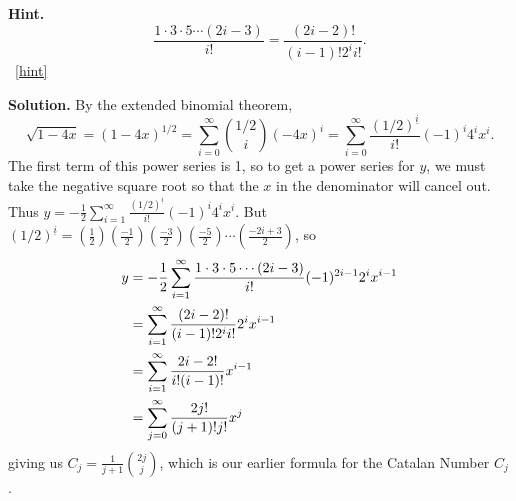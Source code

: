 \documentclass{book}
\begin{document}
\begin{activity}[]
\begin{enumerate}[font=\bfseries,label=(\alph*),ref=\alph*]
\par\smallskip%
\noindent\textbf{Hint.}\hypertarget{hint-175}{}\quad%
\hypertarget{p-1417}{}%
%
\begin{equation*}
\frac{1\cdot 3\cdot 5\cdots (2i-3)}{i!} = \frac{(2i-2)!}{(i-1)!2^i i!}\text{.}
\end{equation*}
%
~\hfill{\tiny\hyperlink{a-271.b}{[hint]}\hypertarget{q-271.b}{}}\par\smallskip%
\noindent\textbf{Solution.}\hypertarget{solution-188}{}\quad%
\hypertarget{p-1418}{}%
By the extended binomial theorem,%
\begin{equation*}
\sqrt{1-4x}=(1-4x)^{1/2} = \sum_{i=0}^\infty \binom{1/2}{i}(-4x)^i=
\sum_{i=0}^\infty \frac{(1/2)^{\underline{i}}}{i!}(-1)^i4^ix^i\text{.}
\end{equation*}
The first term of this power series is 1, so to get a power series for \(y\), we must take the negative square root so that the \(x\) in the denominator will cancel out. Thus \(y=-\frac{1}{2}\sum_{i=1}^\infty \frac{(1/2)^{\underline{i}}}{i!}(-1)^i4^ix^i\). But \((1/2)^{\underline{i}}=(\frac{1}{2})(\frac{-1}{2})(\frac{-3}{2})(\frac{-5}{2})\cdots (\frac{-2i+3}{2})\), so%
\begin{align*}
y &= -\frac{1}{2}\sum_{i=1}^\infty\frac{1\cdot3\cdot5\cdots(2i-3)}{i!}(-1)^{2i-1}2^ix^{i-1}\\
&=  \sum_{i=1}^\infty \frac{(2i-2)!}{(i-1)!2^{i}i!}2^ix^{i-1}\\
&=  \sum_{i=1}^\infty\frac{2i-2!}{i!(i-1)!}x^{i-1}\\
&= \sum_{j=0}^\infty\frac{2j!}{(j+1)!j!}x^j
\end{align*}
giving us \(C_j=\frac{1}{j+1}\binom{2j}{j}\), which is our earlier formula for the Catalan Number \(C_j\).%
\end{enumerate}
\end{activity}
\end{document}
